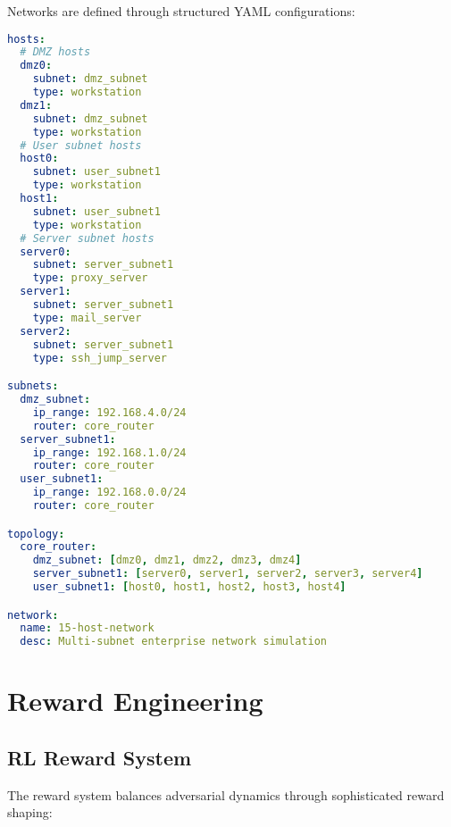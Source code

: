 \documentclass[12pt,a4paper]{article}
\begin{document}
Networks are defined through structured YAML configurations:

\begin{lstlisting}[language=yaml, caption=15-Host Network Configuration]
hosts:
  # DMZ hosts
  dmz0:
    subnet: dmz_subnet
    type: workstation
  dmz1:
    subnet: dmz_subnet
    type: workstation
  # User subnet hosts
  host0:
    subnet: user_subnet1
    type: workstation
  host1:
    subnet: user_subnet1
    type: workstation
  # Server subnet hosts
  server0:
    subnet: server_subnet1
    type: proxy_server
  server1:
    subnet: server_subnet1
    type: mail_server
  server2:
    subnet: server_subnet1
    type: ssh_jump_server

subnets:
  dmz_subnet:
    ip_range: 192.168.4.0/24
    router: core_router
  server_subnet1:
    ip_range: 192.168.1.0/24
    router: core_router
  user_subnet1:
    ip_range: 192.168.0.0/24
    router: core_router

topology:
  core_router:
    dmz_subnet: [dmz0, dmz1, dmz2, dmz3, dmz4]
    server_subnet1: [server0, server1, server2, server3, server4]
    user_subnet1: [host0, host1, host2, host3, host4]

network:
  name: 15-host-network
  desc: Multi-subnet enterprise network simulation
\end{lstlisting}

\section{Reward Engineering}

\subsection{RL Reward System}

The reward system balances adversarial dynamics through sophisticated reward shaping:
\end{document}
